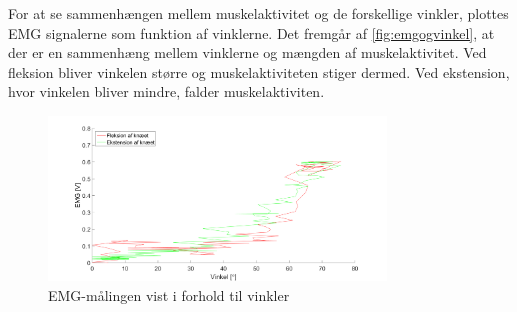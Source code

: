 For at se sammenhængen mellem muskelaktivitet og de forskellige vinkler, plottes EMG signalerne som funktion af vinklerne. Det fremgår af \autoref{fig:emgogvinkel}, at der er en sammenhæng mellem vinklerne og mængden af muskelaktivitet. Ved fleksion bliver vinkelen større og muskelaktiviteten stiger dermed. Ved ekstension, hvor vinkelen bliver mindre, falder muskelaktiviten.





\begin{figure}[H]
	\centering
	\includegraphics[width=0.8\textwidth]{figures/Pilotforsoeg/emg_vinkler}
	\caption{EMG-målingen vist i forhold til vinkler}
	\label{fig:emgogvinkel}
\end{figure}



%
%
% 
